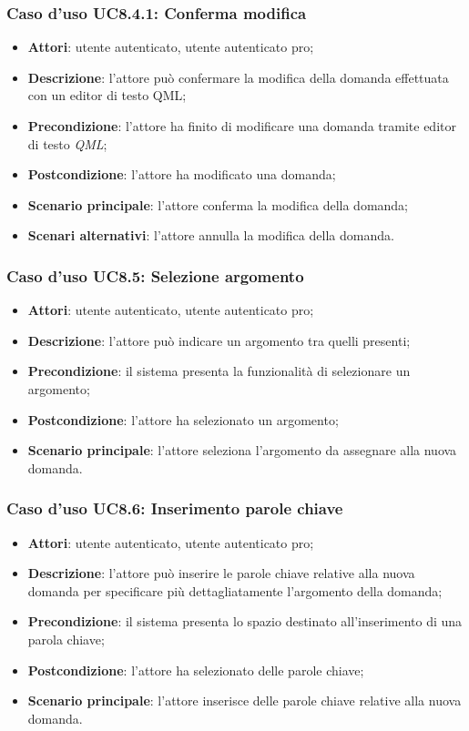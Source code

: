 		\subsubsection{Caso d'uso UC8.4.1: Conferma modifica}
		\begin{itemize}
			\item
			\textbf{Attori}: utente autenticato, utente autenticato pro;
			\item
			\textbf{Descrizione}: l'attore può confermare la modifica della domanda effettuata con un editor di testo QML;
			\item		
			\textbf{Precondizione}: l'attore ha finito di modificare una domanda tramite editor di testo \textit{QML};
			\item
			\textbf{Postcondizione}: l'attore ha modificato una domanda;
			\item
			\textbf{Scenario principale}: l'attore conferma la modifica della domanda;		
			\item
			\textbf{Scenari alternativi}: l'attore annulla la modifica della domanda.
		\end{itemize}
		
	\subsubsection{Caso d'uso UC8.5: Selezione argomento}
	\begin{itemize}
		\item
		\textbf{Attori}: utente autenticato, utente autenticato pro;
		\item
		\textbf{Descrizione}: l'attore può indicare un argomento tra quelli presenti;
		\item		
		\textbf{Precondizione}: il sistema presenta la funzionalità di selezionare un argomento;
		\item
		\textbf{Postcondizione}: l'attore ha selezionato un argomento;
		\item
		\textbf{Scenario principale}: l'attore seleziona l'argomento da assegnare alla nuova domanda.		
	\end{itemize}
	
	\subsubsection{Caso d'uso UC8.6: Inserimento parole chiave}
	\begin{itemize}
		\item
		\textbf{Attori}: utente autenticato, utente autenticato pro;
		\item
		\textbf{Descrizione}: l'attore può inserire le parole chiave relative alla nuova domanda per specificare più dettagliatamente l'argomento della domanda;
		\item		
		\textbf{Precondizione}: il sistema presenta lo spazio destinato all'inserimento di una parola chiave;
		\item
		\textbf{Postcondizione}: l'attore ha selezionato delle parole chiave;
		\item
		\textbf{Scenario principale}: l'attore inserisce delle parole chiave relative alla nuova domanda.	
	\end{itemize}
